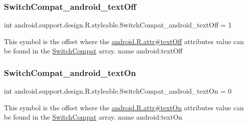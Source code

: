 \subsubsection{\texorpdfstring{Switch\+Compat\+\_\+android\+\_\+text\+Off}{SwitchCompat\_android\_textOff}}
{\footnotesize\ttfamily int android.\+support.\+design.\+R.\+styleable.\+Switch\+Compat\+\_\+android\+\_\+text\+Off = 1\hspace{0.3cm}{\ttfamily [static]}}

This symbol is the offset where the \hyperlink{}{android.\+R.\+attr\#text\+Off} attribute\textquotesingle{}s value can be found in the \hyperlink{classandroid_1_1support_1_1design_1_1R_1_1styleable_a7389a923bf3e321b6b5d10b0589547a1}{Switch\+Compat} array.  name android\+:text\+Off \mbox{\label{classandroid_1_1support_1_1design_1_1R_1_1styleable_a0136948ad38febd192da29e124c66592}} 
\subsubsection{\texorpdfstring{Switch\+Compat\+\_\+android\+\_\+text\+On}{SwitchCompat\_android\_textOn}}
{\footnotesize\ttfamily int android.\+support.\+design.\+R.\+styleable.\+Switch\+Compat\+\_\+android\+\_\+text\+On = 0\hspace{0.3cm}{\ttfamily [static]}}

This symbol is the offset where the \hyperlink{}{android.\+R.\+attr\#text\+On} attribute\textquotesingle{}s value can be found in the \hyperlink{classandroid_1_1support_1_1design_1_1R_1_1styleable_a7389a923bf3e321b6b5d10b0589547a1}{Switch\+Compat} array.  name android\+:text\+On \mbox{\label{classandroid_1_1support_1_1design_1_1R_1_1styleable_a972b91a83c0a2fdfefe8475614790641}} 
